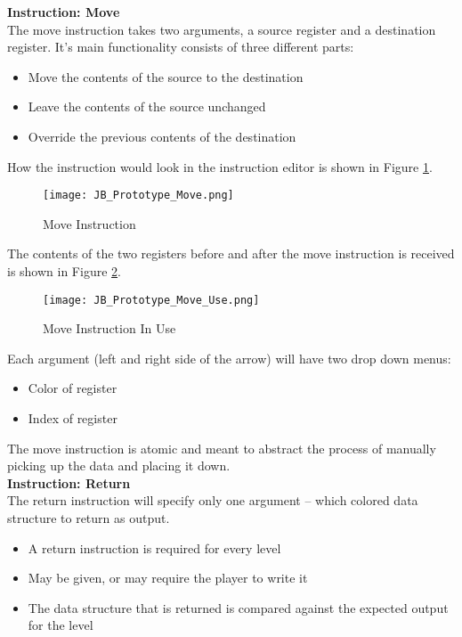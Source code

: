 \textbf{Instruction: Move}\\
The move instruction takes two arguments, a source register and a destination register.
It's main functionality consists of three different parts:
\begin{itemize}
	\item Move the contents of the source to the destination
	\item Leave the contents of the source unchanged
	\item Override the previous contents of the destination
\end{itemize}

How the instruction would look in the instruction editor is shown in Figure
\ref{fig:Move_Instruction}.\\

\begin{figure}[!hb]
	\caption{Move Instruction}
	\label{fig:Move_Instruction}
	\centering
	\texttt{[image: JB\_Prototype\_Move.png]}
\end{figure}

The contents of the two registers before and after the move instruction is
received is shown in Figure \ref{fig:Move_Instruction_Use}.\\

\begin{figure}[!htb]
	\caption{Move Instruction In Use}
	\label{fig:Move_Instruction_Use}
	\centering
	\texttt{[image: JB\_Prototype\_Move\_Use.png]}
\end{figure}

Each argument (left and right side of the arrow) will have two drop down menus:
\begin{itemize}
	\item Color of register
	\item Index of register
\end{itemize}

The move instruction is atomic and meant to abstract the process of manually
picking up the data and placing it down.\\

\textbf{Instruction: Return}\\
The return instruction will specify only one argument -- which colored data structure
to return as output.\\
\begin{itemize}
	\item A return instruction is required for every level
	\item May be given, or may require the player to write it
	\item The data structure that is returned is compared against the expected
		output for the level
\end{itemize}

